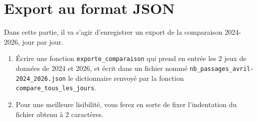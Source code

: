 \documentclass[11pt,a4paper]{article}
\begin{document}
\section{Export au format JSON}

Dans cette partie, il va s'agir d'enregistrer un export de la comparaison 2024-2026, jour par jour.

\begin{enumerate}
    \item Écrire une fonction \verb+exporte_comparaison+ qui prend en entrée les 2 jeux de données de 2024 et 2026, et écrit dans un fichier nommé  \verb+nb_passages_avril-2024_2026.json+ le dictionnaire renvoyé par la fonction \verb+compare_tous_les_jours+.
    \item Pour une meilleure lisibilité, vous ferez en sorte de fixer l'indentation du fichier obtenu à 2 caractères.
\end{enumerate}
\end{document}
